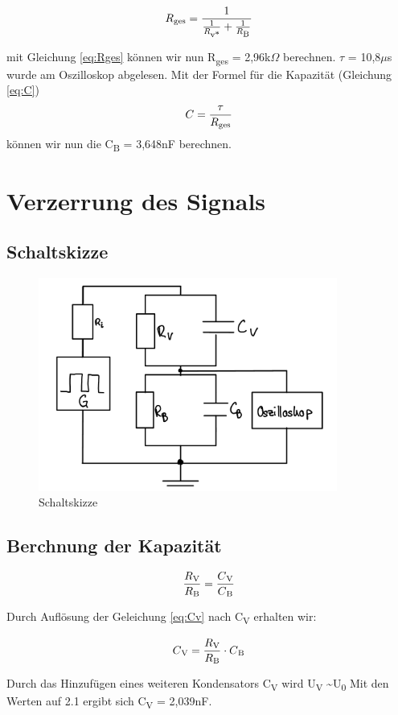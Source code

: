 \begin{equation}
	R\textsubscript{ges} = \frac{1}{\frac{1}{R\textsubscript{v*}} + 
	\frac{1}{R\textsubscript{B}}}
	\label{eq:Rges}
\end{equation}

mit Gleichung \ref*{eq:Rges} können wir nun R\textsubscript{ges} = 2,96k$\Omega$
berechnen.
$\tau$ = 10,8$\mu$s wurde am Oszilloskop abgelesen. Mit der Formel für die Kapazität
(Gleichung \ref*{eq:C})
\begin{equation}
	C = \frac{\tau}{R\textsubscript{ges}}
	\label{eq:C}
\end{equation}
können wir nun die C\textsubscript{B} = 3,648nF berechnen.


\section{Verzerrung des Signals}
\subsection{Schaltskizze}

\begin{figure}[H]
	\centering
	\includegraphics[height=7cm]{images/Versuch2/2_Schaltungsskizze.jpeg} 
	\caption{Schaltskizze}
	\label{fig: Schaltungsskizze}
\end{figure}

\subsection{Berchnung der Kapazität}

\begin{equation}
	\frac{R\textsubscript{V}}{R\textsubscript{B}} = \frac{C\textsubscript{V}}{C\textsubscript{B}}
	\label{eq:Cv}
\end{equation}

Durch Auflösung der Geleichung \ref*{eq:Cv} nach C\textsubscript{V}
erhalten wir: 

\begin{equation}
	C\textsubscript{V} = \frac{R\textsubscript{V}}{R\textsubscript{B}} \cdot C\textsubscript{B}
	\label{eq:Cv2}
\end{equation}

Durch das Hinzufügen eines weiteren Kondensators C\textsubscript{V} 
wird U\textsubscript{V} \textasciitilde U\textsubscript{0}
Mit den Werten auf 2.1 ergibt sich C\textsubscript{V} = 2,039nF.


